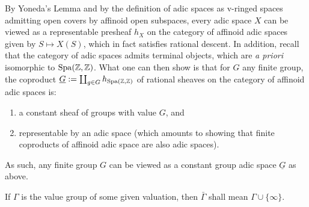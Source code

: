             \begin{remark} \label{remark: constant_finite_groups_as_adic_spaces}
                By Yoneda's Lemma and by the definition of adic spaces as v-ringed spaces admitting open covers by affinoid open subspaces, every adic space $X$ can be viewed as a representable presheaf $h_X$ on the category of affinoid adic spaces given by $S \mapsto X(S)$, which in fact satisfies rational descent. In addition, recall that the category of adic spaces admits terminal objects, which are \textit{a priori} isomorphic to $\operatorname{Spa}(\mathbb{Z}, \mathbb{Z})$. What one can then show is that for $G$ any finite group, the coproduct $\underline{G} := \coprod_{g \in G} h_{\operatorname{Spa}(\mathbb{Z}, \mathbb{Z})}$ of rational sheaves on the category of affinoid adic spaces is:
                    \begin{enumerate}
                        \item a constant sheaf of groups with value $G$, and
                        \item representable by an adic space (which amounts to showing that finite coproducts of affinoid adic space are also adic spaces).
                    \end{enumerate}
                As such, any finite group $G$ can be viewed as a constant group adic space $\underline{G}$ as above.
            \end{remark}
            \begin{convention}
                If $\Gamma$ is the value group of some given valuation, then $\bar{\Gamma}$ shall mean $\Gamma \cup \{\infty\}$.
            \end{convention}
